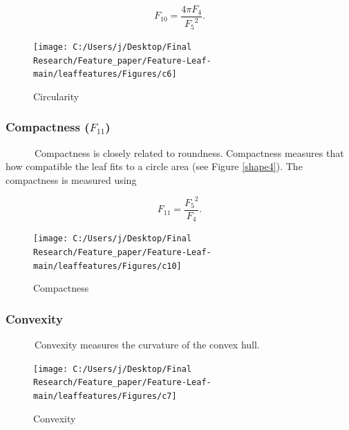 \documentclass{article}
\begin{document}
\begin{equation}
    F_{10} = \frac{4 \pi F_4}{{F_5}^2}.
\label{calround}
\end{equation}

\begin{figure}[!ht]

{\centering \texttt{[image: C:/Users/j/Desktop/Final Research/Feature\_paper/Feature-Leaf-main/leaffeatures/Figures/c6]} 

}

\caption{\label{shape3}Circularity}\label{fig:unnamed-chunk-21}
\end{figure}

\hypertarget{compactness-f_11}{%
\subsubsection{\texorpdfstring{Compactness
(\(F_{11}\))}{Compactness (F\_\{11\})}}\label{compactness-f_11}}

~~~~~~Compactness is closely related to roundness. Compactness measures
that how compatible the leaf fits to a circle area (see Figure
\ref{shape4}). The compactness is measured using

\begin{equation}
    F_{11} = \frac{{F_5}^2}{F_4}.
\label{calcompact}
\end{equation}

\begin{figure}[!ht]

{\centering \texttt{[image: C:/Users/j/Desktop/Final Research/Feature\_paper/Feature-Leaf-main/leaffeatures/Figures/c10]} 

}

\caption{\label{shape4}Compactness}\label{fig:unnamed-chunk-22}
\end{figure}

\hypertarget{convexity}{%
\subsubsection{Convexity}\label{convexity}}

~~~~~~Convexity measures the curvature of the convex hull.

\begin{figure}[!ht]

{\centering \texttt{[image: C:/Users/j/Desktop/Final Research/Feature\_paper/Feature-Leaf-main/leaffeatures/Figures/c7]} 

}

\caption{\label{shape7}Convexity}\label{fig:unnamed-chunk-23}
\end{figure}
\end{document}
